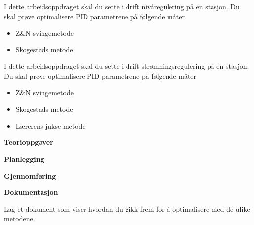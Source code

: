 

\noindent

\vskip 5pt



I dette arbeidsoppdraget skal du sette i drift nivåregulering på en stasjon. Du skal prøve optimalisere PID parametrene på følgende måter\begin{itemize}[noitemsep]
\item Z\&N svingemetode
\item Skogestads metode
\end{itemize}
I dette arbeidsoppdraget skal du sette i drift strømningsregulering på en stasjon. Du skal prøve optimalisere PID parametrene på følgende måter\begin{itemize}[noitemsep]
\item Z\&N svingemetode
\item Skogestads metode
\item Lærerens jukse metode
\end{itemize}



\textbf{Teorioppgaver}

\textbf{Planlegging}

\textbf{Gjennomføring}

\textbf{Dokumentasjon}

Lag et dokument som viser hvordan du gikk frem for å optimalisere med de ulike metodene. 















\vfil \eject

















